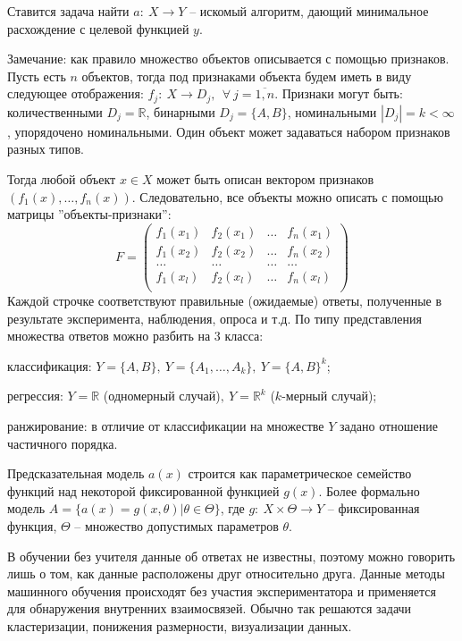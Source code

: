 Ставится задача найти $a:~X \rightarrow Y$ -- искомый алгоритм, дающий минимальное расхождение с целевой функцией $y$.

Замечание: как правило множество объектов описывается с помощью признаков. Пусть есть $n$ объектов, тогда под признаками объекта будем иметь в виду следующее отображения: $f_j:~X \rightarrow D_j,~~\forall~j=\overline{1,n}$.
Признаки могут быть: количественными $D_j=\mathbb{R}$, бинарными $D_j=\{A, B\}$, номинальными $|D_j|=k<\infty$, упорядочено номинальными. Один объект может задаваться набором признаков разных типов.

Тогда любой объект $x \in X$ может быть описан вектором признаков $(f_1(x), \dots, f_n(x))$.
Следовательно, все объекты можно описать с помощью матрицы ''объекты-признаки'':
$$ F = 
\begin{pmatrix}
f_1(x_1) & f_2(x_1) & \dots & f_n(x_1) \\
f_1(x_2) & f_2(x_2) & \dots & f_n(x_2) \\
\dots    & \dots    & \dots & \dots    \\
f_1(x_l) & f_2(x_l) & \dots & f_n(x_l) \\
\end{pmatrix}
$$
Каждой строчке соответствуют правильные (ожидаемые) ответы, полученные в результате эксперимента, наблюдения, опроса и т.д. По типу представления множества ответов можно разбить на 3 класса:
\begin{description}[font=$\bullet$]
    \item классификация: $Y=\{A,B\},~Y=\{A_1,\dots,A_k\},~Y=\{A,B\}^k$;
    \item регрессия: $Y=\mathbb{R}$ (одномерный случай)$,~Y=\mathbb{R}^k$ ($k$-мерный случай);
    \item ранжирование: в отличие от классификации на множестве $Y$ задано отношение частичного порядка.
\end{description}

Предсказательная модель $a(x)$ строится как параметрическое семейство функций над некоторой фиксированной функцией $g(x)$. Более формально модель $A = \{ a(x) = g(x,\theta) | \theta \in \Theta \}$, где $g:~X \times \Theta \rightarrow Y$ -- фиксированная функция, $\Theta$ -- множество допустимых параметров $\theta$.


В обучении без учителя данные об ответах не известны, поэтому можно говорить лишь о том, как данные расположены друг относительно друга. Данные методы машинного обучения происходят без участия экспериментатора и применяется для обнаружения внутренних взаимосвязей. Обычно так решаются задачи кластеризации, понижения размерности, визуализации данных.

